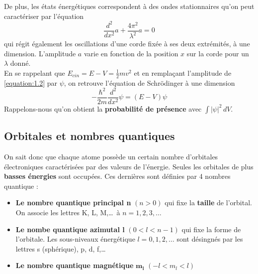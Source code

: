 	\noindent De plus, les états énergétiques correspondent à des ondes stationnaires qu'on peut caractériser par l'équation 
	\begin{equation}
	\frac{d^2}{dx^2}a + \frac{4\pi ^2}{\lambda ^2}a = 0
	\label{equation:1.2}
	\end{equation}	 
	qui régit également les oscillations d'une corde fixée à ses deux extrémités, à une dimension. L'amplitude $a$ varie en fonction de la position $x$ sur la corde pour un $\lambda$ donné. \\
	En se rappelant que $E_{cin} = E-V = \frac{1}{2}mv^2$ et en remplaçant l'amplitude de \eqref{equation:1.2} par $\psi$, on retrouve l'équation de Schrödinger à une dimension 
	\begin{equation}
	-\frac{\hbar ^2}{2m}\frac{d^2}{dx^2}\psi = (E-V)\psi
	\end{equation}
	Rappelons-nous qu'on obtient la \textbf{probabilité de présence} avec $\int |\psi| ^2 \, dV.$
	
\subsection{Orbitales et nombres quantiques}
	\noindent On sait donc que chaque atome possède un certain nombre d'orbitales électroniques caractérisées par des valeurs de l'énergie. Seules les orbitales de plus \textbf{basses énergies} sont occupées. Ces dernières sont définies par 4 nombres quantique :
	\begin{itemize}
	\item \textbf{Le nombre quantique principal n} $(n>0)$ qui fixe la \textbf{taille} de l'orbital. On associe les lettres K, L, M,\dots \ à $n=1,2,3, \dots$
	\item \textbf{Le nombe quantique azimutal l} $(0<l<n-1)$ qui fixe la forme de l'orbitale. Les sous-niveaux énergétique $l = 0,1,2, \dots$ sont désingnés par les lettres s (sphérique), p, d, f,\dots
	\item \textbf{Le nombre quantique magnétique } $\mathbf{m_l}$ $(-l <m_l<l)$
	\end{itemize}